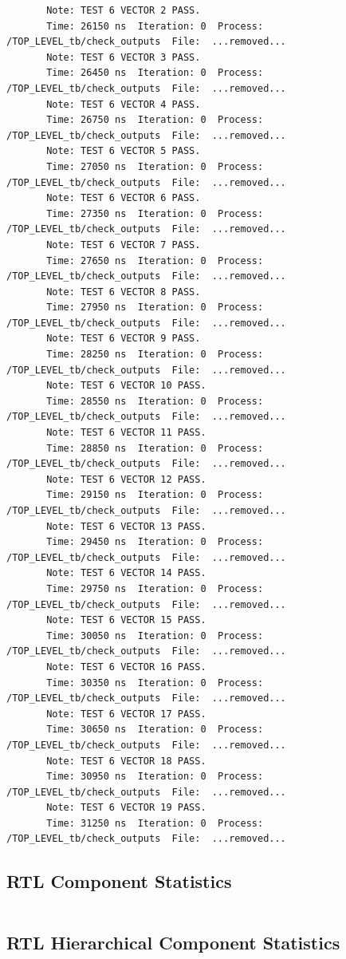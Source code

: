 \documentclass[11pt]{report}
\begin{document}
\begin{verbatim}
       Note: TEST 6 VECTOR 2 PASS.
       Time: 26150 ns  Iteration: 0  Process: /TOP_LEVEL_tb/check_outputs  File:  ...removed...
       Note: TEST 6 VECTOR 3 PASS.
       Time: 26450 ns  Iteration: 0  Process: /TOP_LEVEL_tb/check_outputs  File:  ...removed...
       Note: TEST 6 VECTOR 4 PASS.
       Time: 26750 ns  Iteration: 0  Process: /TOP_LEVEL_tb/check_outputs  File:  ...removed...
       Note: TEST 6 VECTOR 5 PASS.
       Time: 27050 ns  Iteration: 0  Process: /TOP_LEVEL_tb/check_outputs  File:  ...removed...
       Note: TEST 6 VECTOR 6 PASS.
       Time: 27350 ns  Iteration: 0  Process: /TOP_LEVEL_tb/check_outputs  File:  ...removed...
       Note: TEST 6 VECTOR 7 PASS.
       Time: 27650 ns  Iteration: 0  Process: /TOP_LEVEL_tb/check_outputs  File:  ...removed...
       Note: TEST 6 VECTOR 8 PASS.
       Time: 27950 ns  Iteration: 0  Process: /TOP_LEVEL_tb/check_outputs  File:  ...removed...
       Note: TEST 6 VECTOR 9 PASS.
       Time: 28250 ns  Iteration: 0  Process: /TOP_LEVEL_tb/check_outputs  File:  ...removed...
       Note: TEST 6 VECTOR 10 PASS.
       Time: 28550 ns  Iteration: 0  Process: /TOP_LEVEL_tb/check_outputs  File:  ...removed...
       Note: TEST 6 VECTOR 11 PASS.
       Time: 28850 ns  Iteration: 0  Process: /TOP_LEVEL_tb/check_outputs  File:  ...removed...
       Note: TEST 6 VECTOR 12 PASS.
       Time: 29150 ns  Iteration: 0  Process: /TOP_LEVEL_tb/check_outputs  File:  ...removed...
       Note: TEST 6 VECTOR 13 PASS.
       Time: 29450 ns  Iteration: 0  Process: /TOP_LEVEL_tb/check_outputs  File:  ...removed...
       Note: TEST 6 VECTOR 14 PASS.
       Time: 29750 ns  Iteration: 0  Process: /TOP_LEVEL_tb/check_outputs  File:  ...removed...
       Note: TEST 6 VECTOR 15 PASS.
       Time: 30050 ns  Iteration: 0  Process: /TOP_LEVEL_tb/check_outputs  File:  ...removed...
       Note: TEST 6 VECTOR 16 PASS.
       Time: 30350 ns  Iteration: 0  Process: /TOP_LEVEL_tb/check_outputs  File:  ...removed...
       Note: TEST 6 VECTOR 17 PASS.
       Time: 30650 ns  Iteration: 0  Process: /TOP_LEVEL_tb/check_outputs  File:  ...removed...
       Note: TEST 6 VECTOR 18 PASS.
       Time: 30950 ns  Iteration: 0  Process: /TOP_LEVEL_tb/check_outputs  File:  ...removed...
       Note: TEST 6 VECTOR 19 PASS.
       Time: 31250 ns  Iteration: 0  Process: /TOP_LEVEL_tb/check_outputs  File:  ...removed...
\end{verbatim}

\subsection*{RTL Component Statistics}
\inputminted[firstline=165,lastline=190]{text}{../../../DE_Project_T2/DE_Project_T2.runs/synth_1/TOP_LEVEL.vds}

\newpage

\subsection*{RTL Hierarchical Component Statistics}
\inputminted[firstline=193,lastline=264]{text}{../../../DE_Project_T2/DE_Project_T2.runs/synth_1/TOP_LEVEL.vds}
\end{document}
